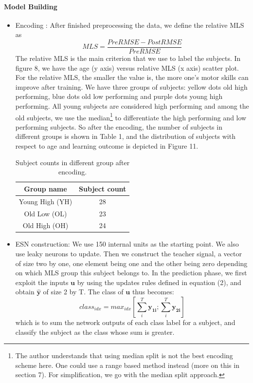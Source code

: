 \documentclass[a4paper,11pt,oneside]{article}
\begin{document}
\paragraph{Model Building} 

\begin{itemize}
	\item Encoding : After finished preprocessing the data, we define the relative MLS as $$ MLS = \frac{PreRMSE - PostRMSE}{PreRMSE}  $$
	The relative MLS is the main criterion that we use to label the subjects.   
	In figure 8, we have the age (y axis) versus relative MLS (x axis) scatter plot.  For the relative MLS, the smaller the value is, the more one's motor skills can improve after training. We have three groups of subjects: yellow dots old high performing, blue dots old low performing and purple dots young high performing. All young subjects are considered high performing and among the old subjects, we use the median\footnote{The author understands that using median split is not the best encoding scheme here. One could use a range based method instead (more on this in section 7). For simplification, we go with the median split approach.  } to differentiate the high performing and low performing subjects. So after the encoding, the number of subjects in different groups is shown in Table 1, and the distribution of subjects with respect to age and learning outcome is depicted in Figure 11.
	
	\begin{table}[h]
		\centering
		\begin{tabular}{||c c ||} 
			\hline
			Group name & Subject count  \\ [0.5ex] 
			\hline\hline
			Young High (YH)  & 28 \\ 
			Old Low (OL) & 23  \\
			Old High (OH) & 24  \\ [0.5ex] 
			\hline
		\end{tabular}
		\caption{Subject counts in different group after encoding.}
	\end{table}
	
	\item ESN construction:  We use 150 internal units as the starting point. We also use leaky neurons to update. Then we construct the teacher signal, a vector of size two by one, one element being one and the other being zero depending on which MLS group this subject belongs to. In the prediction phase, we first exploit the inputs $\mathbf{u}$ by using the updates rules defined in equation (2), and obtain $\hat{\mathbf{y}}$ of size 2 by T. The class of $\mathbf{u}$ thus becomes:
	$$ class_{idx} = max_{idx} [\sum_i^T\mathbf{y_{1i}}; \sum_i^T\mathbf{y_{2i}}] $$
	which is to sum the network outputs of each class label for a subject, and classify the subject as the class whose sum is greater.
	

\end{itemize}
\end{document}
